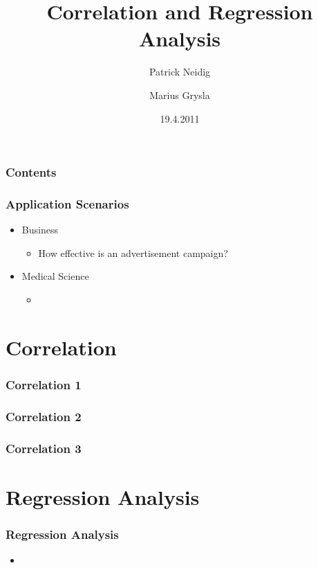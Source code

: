 \documentclass{beamer}
\begin{document}
\title{Correlation and Regression Analysis}
\author{Patrick Neidig \and Marius Grysla}
\date{19.4.2011}
\frame{\titlepage}

\begin{frame}
 \frametitle{Contents}
 \tableofcontents
\end{frame}

\begin{frame}
 \frametitle{Application Scenarios}

 \begin{itemize}
  \item Business
  \begin{itemize}
   \item How effective is an advertisement campaign?
  \end{itemize}

  \item Medical Science
  \begin{itemize}
   \item 
  \end{itemize}

 \end{itemize}

\end{frame}


\section{Correlation}

\begin{frame}
 \frametitle{Correlation 1}
\end{frame}

\begin{frame}
 \frametitle{Correlation 2}
\end{frame}

\begin{frame}
 \frametitle{Correlation 3}
\end{frame}

\section{Regression Analysis}

\begin{frame}
 \frametitle{Regression Analysis}
 

 \begin{itemize}
  \item 
 \end{itemize}

\end{frame}
\end{document}

